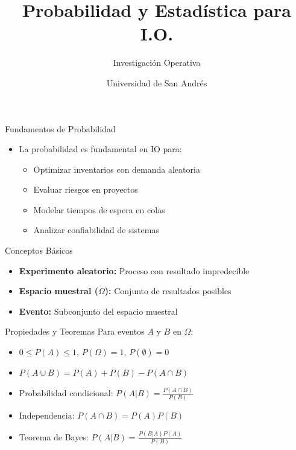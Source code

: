 \documentclass{beamer}
\title{\Huge\textbf{Probabilidad y Estadística para I.O.}}
\subtitle{Investigación Operativa}
\author{Universidad de San Andrés}
\date{}
\begin{document}
\begin{frame}
    \titlepage
\end{frame}

\begin{frame}{Fundamentos de Probabilidad}
    \begin{itemize}
        \item La probabilidad es fundamental en IO para:
        \begin{itemize}
            \item Optimizar inventarios con demanda aleatoria
            \item Evaluar riesgos en proyectos
            \item Modelar tiempos de espera en colas
            \item Analizar confiabilidad de sistemas
        \end{itemize}
    \end{itemize}
\end{frame}

\begin{frame}{Conceptos Básicos}
    \begin{itemize}
        \item \textbf{Experimento aleatorio:} Proceso con resultado impredecible
        \item \textbf{Espacio muestral ($\Omega$):} Conjunto de resultados posibles
        \item \textbf{Evento:} Subconjunto del espacio muestral
    \end{itemize}
\end{frame}

\begin{frame}{Propiedades y Teoremas}
    Para eventos $A$ y $B$ en $\Omega$:
    \begin{itemize}
        \item $0 \leq P(A) \leq 1$, $P(\Omega) = 1$, $P(\emptyset) = 0$
        \item $P(A \cup B) = P(A) + P(B) - P(A \cap B)$
        \item Probabilidad condicional: $P(A|B) = \frac{P(A \cap B)}{P(B)}$
        \item Independencia: $P(A \cap B) = P(A)P(B)$
        \item Teorema de Bayes: $P(A|B) = \frac{P(B|A)P(A)}{P(B)}$
    \end{itemize}
\end{frame}
\end{document}

